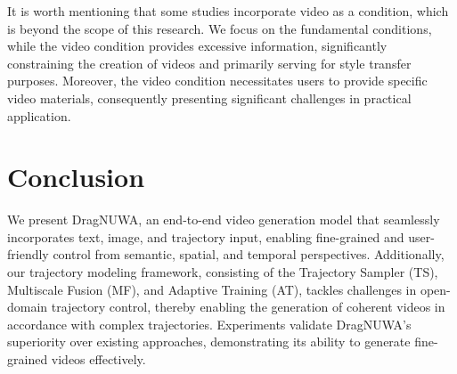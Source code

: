 \documentclass{article} %
\begin{document}
It is worth mentioning that some studies incorporate video as a condition, which is beyond the scope of this research. We focus on the fundamental conditions, while the video condition provides excessive information, significantly constraining the creation of videos and primarily serving for style transfer purposes. Moreover, the video condition necessitates users to provide specific video materials, consequently presenting significant challenges in practical application.

\section{Conclusion}
We present DragNUWA, an end-to-end video generation model that seamlessly incorporates text, image, and trajectory input, enabling fine-grained and user-friendly control from semantic, spatial, and temporal perspectives. Additionally, our trajectory modeling framework, consisting of the Trajectory Sampler (TS), Multiscale Fusion (MF), and Adaptive Training (AT), tackles challenges in open-domain trajectory control, thereby enabling the generation of coherent videos in accordance with complex trajectories. Experiments validate DragNUWA's superiority over existing approaches, demonstrating its ability to generate fine-grained videos effectively.





\end{document}
